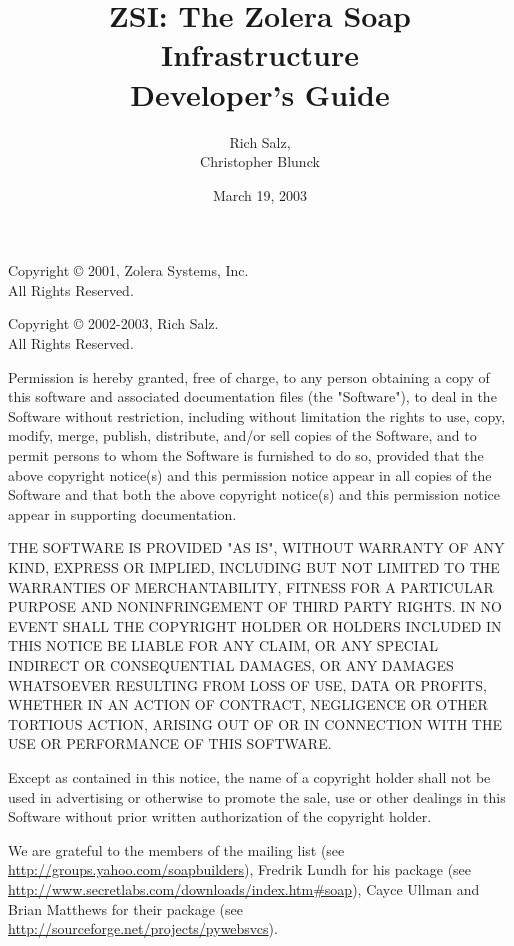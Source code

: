 \documentclass{manual}
\title{ZSI: The Zolera Soap Infrastructure \\
       Developer's Guide}
\author{Rich Salz,\\
        Christopher Blunck}
\date{March 19, 2003}%
\begin{document}
\maketitle


\centerline{}

Copyright \copyright{} 2001, Zolera Systems, Inc.\\
All Rights Reserved.

Copyright \copyright{} 2002-2003, Rich Salz.\\
All Rights Reserved.

Permission is hereby granted, free of charge, to any person obtaining a
copy of this software and associated documentation files (the "Software"),
to deal in the Software without restriction, including without limitation
the rights to use, copy, modify, merge, publish, distribute, and/or
sell copies of the Software, and to permit persons to whom the Software
is furnished to do so, provided that the above copyright notice(s) and
this permission notice appear in all copies of the Software and that
both the above copyright notice(s) and this permission notice appear in
supporting documentation.

THE SOFTWARE IS PROVIDED "AS IS", WITHOUT WARRANTY OF ANY KIND,
EXPRESS OR IMPLIED, INCLUDING BUT NOT LIMITED TO THE WARRANTIES OF
MERCHANTABILITY, FITNESS FOR A PARTICULAR PURPOSE AND NONINFRINGEMENT
OF THIRD PARTY RIGHTS. IN NO EVENT SHALL THE COPYRIGHT HOLDER OR HOLDERS
INCLUDED IN THIS NOTICE BE LIABLE FOR ANY CLAIM, OR ANY SPECIAL INDIRECT
OR CONSEQUENTIAL DAMAGES, OR ANY DAMAGES WHATSOEVER RESULTING FROM LOSS
OF USE, DATA OR PROFITS, WHETHER IN AN ACTION OF CONTRACT, NEGLIGENCE
OR OTHER TORTIOUS ACTION, ARISING OUT OF OR IN CONNECTION WITH THE USE
OR PERFORMANCE OF THIS SOFTWARE.

Except as contained in this notice, the name of a copyright holder
shall not be used in advertising or otherwise to promote the sale, use
or other dealings in this Software without prior written authorization
of the copyright holder.

\vspace{1.5cm}

\centerline{}

We are grateful to the members of the 
mailing list (see \url{http://groups.yahoo.com/soapbuilders}),
Fredrik Lundh for his  package (see
\url{http://www.secretlabs.com/downloads/index.htm\#soap}),
Cayce Ullman and Brian Matthews for their  package
(see \url{http://sourceforge.net/projects/pywebsvcs}).
\end{document}
